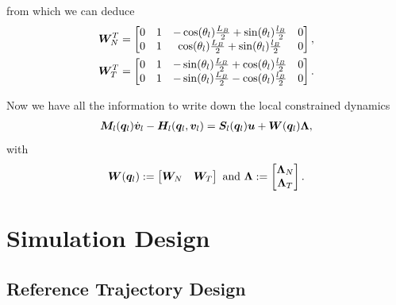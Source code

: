 \documentclass[DC2017114Bouma.tex]{subfiles}
\begin{document}
from which we can deduce
\begin{align}
{\boldsymbol{W}}_N^T &= \begin{bmatrix}
0 & 1 & -\cos(\theta_l)\frac{L_B}{2} + \sin(\theta_l)\frac{l_B}{2} & 0 \\
0 & 1 & \cos(\theta_l)\frac{L_B}{2} + \sin(\theta_l)\frac{l_B}{2} & 0
\end{bmatrix},\\
{\boldsymbol{W}}_T^T &= \begin{bmatrix}
0 & 1 & -\sin(\theta_l)\frac{L_B}{2} + \cos(\theta_l)\frac{l_B}{2} & 0 \\
0 & 1 & -\sin(\theta_l)\frac{L_B}{2} - \cos(\theta_l)\frac{l_B}{2} & 0
\end{bmatrix}.
\end{align}

Now we have all the information to write down the local constrained dynamics
\begin{align}
{\boldsymbol{M}}_l({\boldsymbol{q}}_l)\dot{{\boldsymbol{v}}}_l - {\boldsymbol{H}}_l({\boldsymbol{q}}_l,{\boldsymbol{v}}_l) = {\boldsymbol{S}}_l({\boldsymbol{q}}_l){\boldsymbol{u}} + {\boldsymbol{W}}({\boldsymbol{q}}_l)\boldsymbol{\Lambda},\label{eq:localcontdyn}
\end{align}
with
\begin{align}
{\boldsymbol{W}}({\boldsymbol{q}}_l) := \begin{bmatrix}
{\boldsymbol{W}}_N & {\boldsymbol{W}}_T
\end{bmatrix}\text{ and }\boldsymbol{\Lambda} := \begin{bmatrix}
\boldsymbol{\Lambda}_N\\
\boldsymbol{\Lambda}_T
\end{bmatrix}.
\end{align}

\cleartooddpage
\chapter{Simulation Design}
\section{Reference Trajectory Design}
\end{document}
